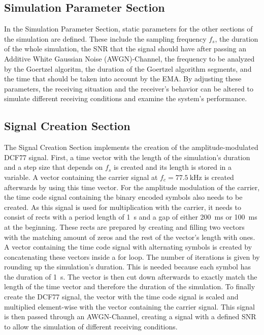 \documentclass[conference]{IEEEtran}
\begin{document}
\subsection{Simulation Parameter Section}
In the Simulation Parameter Section, static parameters for the other sections of the simulation are defined.
These include the sampling frequency $f_{s}$, the duration of the whole simulation, the SNR that the signal should have after passing an Additive White Gaussian Noise (AWGN)-Channel, the frequency to be analyzed by the Goertzel algoritm, the duration of the Goertzel algorithm segments, and the time that should be taken into account by the EMA.
By adjusting these parameters, the receiving situation and the receiver's behavior can be altered to simulate different receiving conditions and examine the system's performance.

\subsection{Signal Creation Section}
The Signal Creation Section implements the creation of the amplitude-modulated DCF77 signal.
First, a time vector with the length of the simulation's duration and a step size that depends on $f_{s}$ is created and its length is stored in a variable.
A vector containing the carrier signal at $f_{c} = \SI{77.5}{\kilo\hertz}$ is created afterwards by using this time vector.
For the amplitude modulation of the carrier, the time code signal containing the binary encoded symbols also needs to be created.
As this signal is used for multiplication with the carrier, it needs to consist of rects with a period length of \SI{1}{\second} and a gap of either \SI{200}{\milli\second} or \SI{100}{\milli\second} at the beginning.
These rects are prepared by creating and filling two vectors with the matching amount of zeros and the rest of the vector's length with ones.
A vector containing the time code signal with alternating symbols is created by concatenating these vectors inside a for loop.
The number of iterations is given by rounding up the simulation's duration.
This is needed because each symbol has the duration of \SI{1}{\second}.
The vector is then cut down afterwards to exactly match the length of the time vector and therefore the duration of the simulation.
To finally create the DCF77 signal, the vector with the time code signal is scaled and multiplied element-wise with the vector containing the carrier signal.
This signal is then passed through an AWGN-Channel, creating a signal with a defined SNR to allow the simulation of different receiving conditions.
\end{document}
